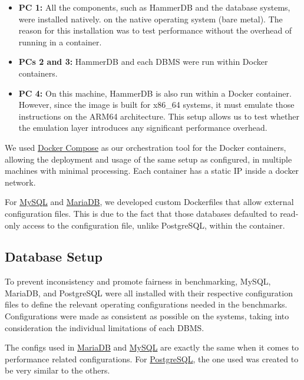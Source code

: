 \begin{itemize}
    \setlength\itemsep{0.1em}
    \item \textbf{PC 1:} All the components, such as HammerDB and the database systems, were installed natively.
    on the native operating system (bare metal). The reason for this installation was to test performance without the overhead of running in a container.
    
    \item \textbf{PCs 2 and 3:} HammerDB and each DBMS were run within Docker containers.

    \item \textbf{PC 4:} On this machine, HammerDB is also run within a Docker container. However, since the image is built for x86\_64 systems, it must emulate those instructions on the ARM64 architecture. This setup allows us to test whether the emulation layer introduces any significant performance overhead. 
\end{itemize}

We used \hyperref[sec:docker-compose]{Docker Compose} as our orchestration tool for the Docker containers, allowing the deployment and usage of the same setup as configured, in multiple machines with minimal processing. Each container has a static IP inside a docker network.

For \hyperref[sec:dockerfile-mysql]{MySQL} and \hyperref[sec:dockerfile-mariadb]{MariaDB}, we developed custom Dockerfiles that allow external configuration files. This is due to the fact that those databases defaulted to read-only access to the configuration file, unlike PostgreSQL, within the container.

\subsection{Database Setup}
\label{sec:database-setup}

To prevent inconsistency and promote fairness in benchmarking, MySQL, MariaDB, and PostgreSQL were all installed with their respective configuration files to define the relevant operating configurations needed in the benchmarks. Configurations were made as consistent as possible on the systems, taking into consideration the individual limitations of each DBMS.

The configs used in \hyperref[sec:mariadb-config]{MariaDB} and \hyperref[sec:mysql-config]{MySQL} are exactly the same when it comes to performance related configurations. For \hyperref[sec:postgresql-config]{PostgreSQL}, the one used was created to be very similar to the others.

